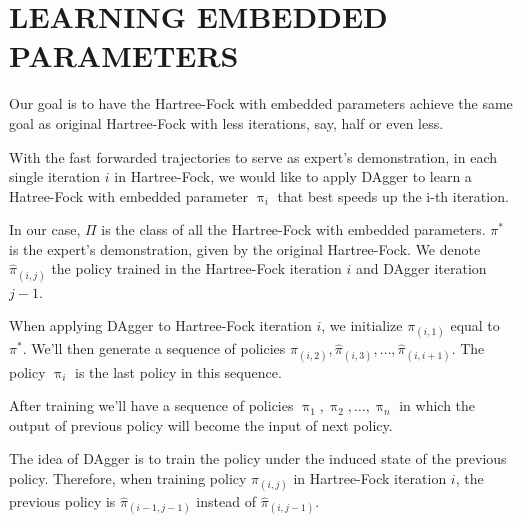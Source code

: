 \documentclass[twoside]{article}
\begin{document}


\section{LEARNING EMBEDDED PARAMETERS}

Our goal is to have the Hartree-Fock with embedded parameters achieve the same goal as original Hartree-Fock with less iterations, say, half or even less.  



% 

With the fast forwarded trajectories to serve as expert's demonstration, in each single iteration $i$ in Hartree-Fock, we would like to apply DAgger to learn a Hatree-Fock with embedded parameter $\uppi_i$ that best speeds up the i-th iteration.   

In our case, $\Pi$ is the class of all the Hartree-Fock with embedded parameters. $\pi^*$ is the expert's demonstration, given by the original Hartree-Fock. We denote $\hat{\pi}_{(i,j)}$  the policy trained in the Hartree-Fock iteration $i$ and DAgger iteration $j-1$. 


When applying DAgger to Hartree-Fock iteration $i$,  we initialize $\pi_{(i,1)}$ equal to $\pi^*$. We'll then generate a sequence of policies $\hat{\pi}_{(i,2)} , \hat{\pi}_{(i,3)}, \ldots, \hat{\pi}_{(i,i+1)}$. The policy $\uppi_i$  is the last policy in this sequence.



 After training we'll have a sequence of policies $\uppi_1, \uppi_2, \ldots, \uppi_n$ in which the output of previous policy will become the input of next policy.

The idea of DAgger is to train the policy under the induced state of the previous policy. Therefore, when training policy $\pi_{(i,j)}$ in Hartree-Fock iteration $i$, the previous policy is $\hat{\pi}_{(i-1,j-1)}$ instead of  $\hat{\pi}_{(i,j-1)}$.
\end{document}
